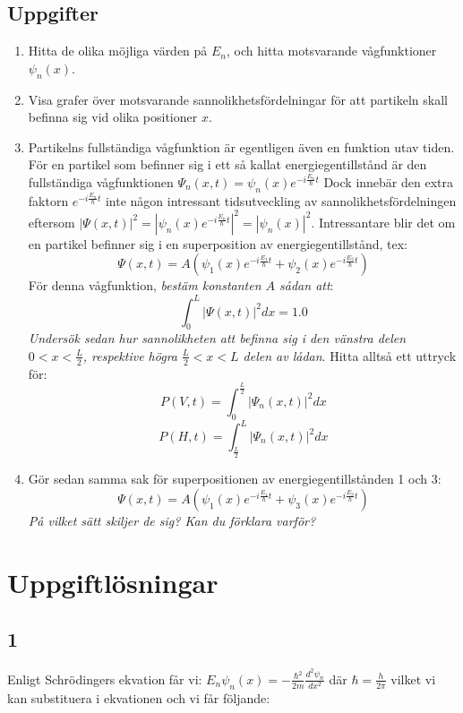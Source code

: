 \documentclass{article}
\newcommand{\wavefun}{\psi_n(x)}
\newcommand{\shrodequ}{E_n \psi_n(x) = - \frac{\hbar^2}{2m} \frac{d^2 \psi_n}{dx^2}}
\newcommand{\shrodprob}{|\psi_n(x)|^2}
\newcommand{\shrodtime}{e^{-i \frac{E_n}{\hbar} t}}
\newcommand{\fullshrodequ}{\Psi_n(x, t) = \psi_n(x) \shrodtime}
\newcommand{\fullshrodprob}{|\Psi_n(x,t)|^2}
\begin{document}
\subsection{Uppgifter}
\begin{enumerate}
	\item Hitta de olika möjliga värden på $E_n$, och hitta motsvarande vågfunktioner $\wavefun$. 
	\item Visa grafer över motsvarande sannolikhetsfördelningar för att partikeln skall befinna sig vid olika positioner $x$.

	\item Partikelns fullständiga vågfunktion är egentligen även en funktion utav tiden. För en partikel som befinner sig i ett så kallat energiegentillstånd är den fullständiga vågfunktionen $\fullshrodequ$
		Dock innebär den extra faktorn $\shrodtime$ inte någon intressant tidsutveckling av sannolikhetsfördelningen eftersom $|\Psi(x, t)|^2 = |\psi_n(x) \shrodtime|^2 = \shrodprob$. Intressantare blir det om en partikel befinner sig i en superposition av energiegentillstånd, tex: $$\Psi(x, t) = A(\psi_1(x)e^{-i \frac{E_1}{\hbar}t} + \psi_2(x) e^{-i \frac{E_2}{\hbar}t})$$ För denna vågfunktion, \emph{bestäm konstanten $A$ sådan att}: $$\int_0^L |\Psi(x, t)|^2 dx = 1.0$$ \emph{Undersök sedan hur sannolikheten att befinna sig i den vänstra delen $0 < x < \frac{L}{2}$, respektive högra $\frac{L}{2} < x < L$ delen av lådan}. Hitta alltså ett uttryck för: $$P(V, t) = \int_0^{\frac{L}{2}} \fullshrodprob dx$$ $$P(H, t) = \int_{\frac{L}{2}}^L \fullshrodprob dx$$

	\item Gör sedan samma sak för superpositionen av energiegentillstånden 1 och 3: $$\Psi(x, t) = A\left(\psi_1(x)e^{-i \frac{E_1}{\hbar}t} + \psi_3(x)e^{-i \frac{E_3}{\hbar}t}\right)$$ \emph{På vilket sätt skiljer de sig? Kan du förklara varför?}
\end{enumerate}

\newpage

\section{Uppgiftlösningar}
\subsection{1}

Enligt Schrödingers ekvation får vi: $\shrodequ$ där $\hbar = \frac{h}{2\pi}$ vilket vi kan substituera i ekvationen och vi får följande:
\end{document}
